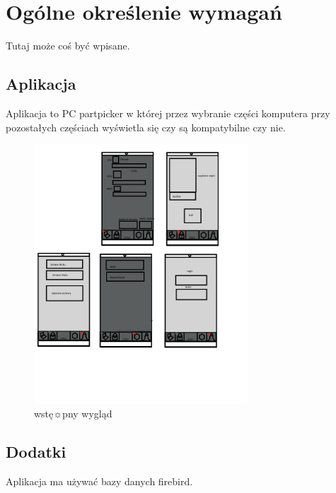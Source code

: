 	\newpage
\section{Ogólne określenie wymagań}		%



\hspace{0.60cm}Tutaj może coś być wpisane. 

\subsection{Aplikacja}  %

\hspace{0.60cm}Aplikacja to PC partpicker w której przez wybranie części komputera przy pozostałych częściach wyświetla się czy są kompatybilne czy nie.

	\begin{figure}[!htb]
	\begin{center}
		\includegraphics[width=8cm]{rys/wyg.png}
		\caption{wstę☼pny wygląd}
		\label{rys:rysunek001}
	\end{center}
\end{figure}



\subsection{Dodatki}  %

\hspace{0.60cm}Aplikacja ma używać bazy danych firebird.

